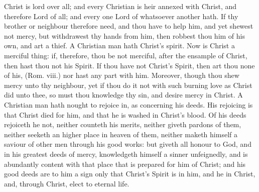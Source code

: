 Christ is lord over all; and every Christian is heir annexed
with Christ, and therefore Lord of all; and every 
one Lord of whatsoever another hath. If thy brother or 
neighbour therefore need, and thou have to help him, 
and yet shewest not mercy, but withdrawest thy hands 
from him, then robbest thou him of his own, and art a 
thief. A Christian man hath Christ's spirit. Now is Christ 
a merciful thing: if, therefore, thou be not merciful, after 
the ensample of Christ, then hast thou not his Spirit. If 
thou have not Christ's Spirit, then art thou none of his, 
(Rom. viii.) nor hast any part with him. Moreover, 
though thou shew mercy unto thy neighbour, yet if thou do 
it not with such burning love as Christ did unto thee, so 
must thou knowledge thy sin, and desire mercy in Christ. 
A Christian man hath nought to rejoice in, as concerning his 
deeds. His rejoicing is that Christ died for him, and that 
he is washed in Christ's blood. Of his deeds rejoiceth he 
not, neither counteth his merits, neither giveth pardons of 
them, neither seeketh an higher place in heaven of them, 
neither maketh himself a saviour of other men through his 
good works: but giveth all honour to God, and in his 
greatest deeds of mercy, knowledgeth himself a sinner unfeignedly,
and is abundantly content with that place that is 
prepared for him of Christ; and his good deeds are to him 
a sign only that Christ's Spirit is in him, and he in Christ, 
and, through Christ, elect to eternal life. 

